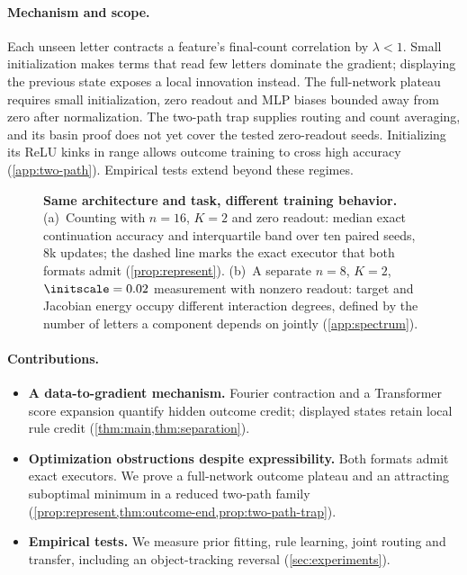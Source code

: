 \paragraph{Mechanism and scope.}
Each unseen letter contracts a feature's final-count correlation by $\lambda<1$.
Small initialization makes terms that read few letters dominate the gradient;
displaying the previous state exposes a local innovation instead.
The full-network plateau requires small initialization, zero readout and MLP
biases bounded away from zero after normalization. The two-path trap supplies
routing and count averaging, and its basin proof does not yet cover the tested
zero-readout seeds. Initializing its ReLU kinks in range allows outcome training
to cross high accuracy (\cref{app:two-path}). Empirical tests extend beyond these regimes.

\begin{figure}[t]
\centering

\caption{\textbf{Same architecture and task, different training behavior.}
(a)~Counting with $n=16$, $K=2$ and zero readout: median exact continuation accuracy and interquartile band over ten paired seeds, $8$k
updates; the dashed line marks the exact executor that both formats admit (\cref{prop:represent}).
(b)~A separate $n=8$, $K=2$, $\initscale=0.02$ measurement with nonzero readout: target and Jacobian energy occupy different interaction degrees, defined by the number of letters a component depends on jointly (\cref{app:spectrum}).}
\label{fig:overview}
\end{figure}

\paragraph{Contributions.}
\begin{itemize}[leftmargin=*,itemsep=3pt,topsep=3pt]
\item \textbf{A data-to-gradient mechanism.} Fourier contraction and a Transformer
score expansion quantify hidden outcome credit; displayed states retain local rule
credit (\cref{thm:main,thm:separation}).
\item \textbf{Optimization obstructions despite expressibility.} Both formats admit
exact executors. We prove a full-network outcome plateau and an attracting
suboptimal minimum in a reduced two-path family
(\cref{prop:represent,thm:outcome-end,prop:two-path-trap}).
\item \textbf{Empirical tests.} We measure prior fitting, rule learning, joint routing
and transfer, including an object-tracking reversal (\cref{sec:experiments}).
\end{itemize}

